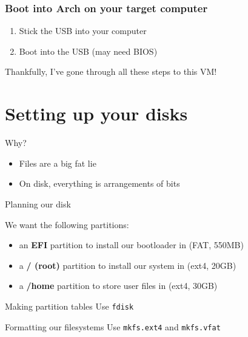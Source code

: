 \documentclass{beamer}
\begin{document}
\begin{frame}
    \frametitle{Boot into Arch on your target computer}

    \begin{enumerate}
        \item Stick the USB into your computer
        \item Boot into the USB (may need BIOS)
    \end{enumerate}
\end{frame}

\begin{frame}
    \Huge
    \centering

    Thankfully, I've gone through all these steps to this VM!
\end{frame}

\section{Setting up your disks}

\begin{frame}{Why?}
    
    \begin{itemize}
        \item Files are a big fat lie
        \item On disk, everything is arrangements of bits
    \end{itemize}
\end{frame}

\begin{frame}{Planning our disk}

    We want the following partitions:
    \begin{itemize}
        \item an \textbf{EFI} partition to install our bootloader in (FAT, 550MB)
        \item a \textbf{/ (root)} partition to install our system in (ext4, 20GB)
        \item a \textbf{/home} partition to store user files in (ext4, 30GB)
    \end{itemize}
\end{frame}

\begin{frame}{Making partition tables}
    Use \texttt{fdisk}
\end{frame}

\begin{frame}{Formatting our filesystems}
    Use \texttt{mkfs.ext4} and \texttt{mkfs.vfat}
\end{frame}
\end{document}
